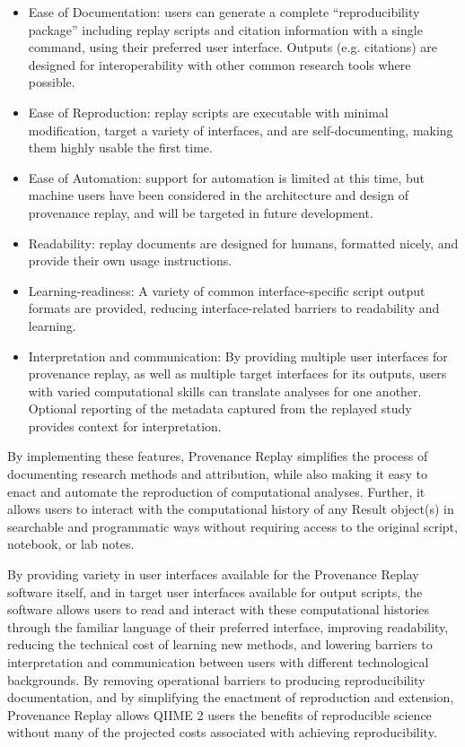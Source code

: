 \begin{itemize}
    \item Ease of Documentation: users can generate a complete “reproducibility
        package” including replay scripts and citation information with a single
        command, using their preferred user interface. Outputs (e.g. citations) are
        designed for interoperability with other common research tools where
        possible.
    \item Ease of Reproduction: replay scripts are executable with minimal
        modification, target a variety of interfaces, and are self-documenting,
        making them highly usable the first time.
    \item Ease of Automation: support for automation is limited at this time,
        but machine users have been considered in the architecture and design of
        provenance replay, and will be targeted in future development.
    \item Readability: replay documents are designed for humans, formatted
        nicely, and provide their own usage instructions.
    \item Learning-readiness: A variety of common interface-specific script
        output formats are provided, reducing interface-related barriers to
        readability and learning.
    \item Interpretation and communication: By providing multiple user
        interfaces for provenance replay, as well as multiple target interfaces for
        its outputs, users with varied computational skills can translate analyses
        for one another. Optional reporting of the metadata captured from the
        replayed study provides context for interpretation.
\end{itemize}

By implementing these features, Provenance Replay simplifies the process of
documenting research methods and attribution, while also making it easy to enact
and automate the reproduction of computational analyses. Further, it allows
users to interact with the computational history of any Result object(s) in
searchable and programmatic ways without requiring access to the original
script, notebook, or lab notes.

By providing variety in user interfaces available for the Provenance Replay
software itself, and in target user interfaces available for output scripts,
the software allows users to read and interact with these computational
histories through the familiar language of their preferred interface, improving
readability, reducing the technical cost of learning new methods, and lowering
barriers to interpretation and communication between users with different
technological backgrounds. By removing operational barriers to producing
reproducibility documentation, and by simplifying the enactment of reproduction
and extension, Provenance Replay allows QIIME 2 users the benefits of
reproducible science without many of the projected costs associated with
achieving reproducibility.

